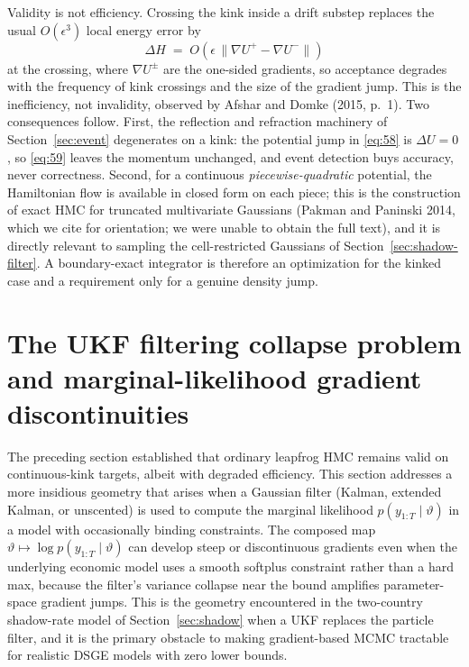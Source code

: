 \documentclass[11pt]{article}
\begin{document}
Validity is not efficiency. Crossing the kink inside a drift substep replaces
the usual $O(\epsilon^3)$ local energy error by
\begin{equation}\label{eq:56a}
 \Delta H \;=\; O\!\left(\epsilon\,
 \bigl\|\nabla U^{+}-\nabla U^{-}\bigr\|\right)
\end{equation}
at the crossing, where $\nabla U^{\pm}$ are the one-sided gradients, so
acceptance degrades with the frequency of kink crossings and the size of the
gradient jump. This is the inefficiency, not invalidity, observed by
Afshar and Domke (2015, p.~1). Two consequences follow. First, the reflection
and refraction machinery of Section~\ref{sec:event} degenerates on a kink:
the potential jump in \eqref{eq:58} is $\Delta U=0$, so \eqref{eq:59} leaves
the momentum unchanged, and event detection buys accuracy, never
correctness. Second, for a continuous \emph{piecewise-quadratic} potential,
the Hamiltonian flow is available in closed form on each piece; this is the
construction of exact HMC for truncated multivariate Gaussians (Pakman and
Paninski 2014, which we cite for orientation; we were unable to obtain the
full text), and it is directly relevant to sampling the cell-restricted
Gaussians of Section~\ref{sec:shadow-filter}. A boundary-exact integrator is
therefore an optimization for the kinked case and a requirement only for a
genuine density jump.

\section{The UKF filtering collapse problem and marginal-likelihood gradient discontinuities}\label{sec:ukf-gradient}

The preceding section established that ordinary leapfrog HMC remains valid on
continuous-kink targets, albeit with degraded efficiency. This section
addresses a more insidious geometry that arises when a Gaussian filter
(Kalman, extended Kalman, or unscented) is used to compute the marginal
likelihood $p(y_{1:T}\mid\vartheta)$ in a model with occasionally binding
constraints. The composed map
$\vartheta\mapsto\log p(y_{1:T}\mid\vartheta)$ can develop steep or
discontinuous gradients even when the underlying economic model uses a smooth
softplus constraint rather than a hard max, because the filter's variance
collapse near the bound amplifies parameter-space gradient jumps. This is the
geometry encountered in the two-country shadow-rate model of
Section~\ref{sec:shadow} when a UKF replaces the particle filter, and it is
the primary obstacle to making gradient-based MCMC tractable for realistic
DSGE models with zero lower bounds.
\end{document}
